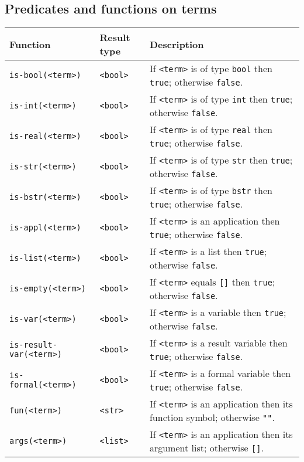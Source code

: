 \subsection{Predicates and functions on terms}
\begin{tabular}{|l|l|p{8cm}|} \hline
 Function				& Result type 	& Description \\ \hline
 {\tt is-bool(<term>)}			& {\tt  <bool>} & If {\tt <term>} is of type {\tt bool} then {\tt true};
							  otherwise {\tt false}.\\
 {\tt is-int(<term>)}			& {\tt  <bool>} & If {\tt <term>} is of type {\tt int} then {\tt true};
							  otherwise {\tt false}.\\
 {\tt is-real(<term>)}			& {\tt  <bool>} & If {\tt <term>} is of type {\tt real} then {\tt true};
							  otherwise {\tt false}.\\
 {\tt is-str(<term>)}			& {\tt  <bool>} & If {\tt <term>} is of type {\tt str} then {\tt true};
							  otherwise {\tt false}.\\
 {\tt is-bstr(<term>)}			& {\tt  <bool>} & If {\tt <term>} is of type {\tt bstr} then {\tt true};
							  otherwise {\tt false}.\\
 {\tt is-appl(<term>)}			& {\tt  <bool>} & If {\tt <term>} is an application then {\tt true};
							  otherwise {\tt false}.\\
 {\tt is-list(<term>)}			& {\tt  <bool>} & If {\tt <term>} is a list then {\tt true};
							  otherwise {\tt false}.\\
 {\tt is-empty(<term>)}			& {\tt  <bool>} & If {\tt <term>} equals {\tt []} then {\tt true};
							  otherwise {\tt false}.\\
 {\tt is-var(<term>)}			& {\tt  <bool>} & If {\tt <term>} is a variable then {\tt true};
							  otherwise {\tt false}.\\
 {\tt is-result-var(<term>)}		& {\tt  <bool>} & If {\tt <term>} is a result variable then {\tt true};
							  otherwise {\tt false}.\\
 {\tt is-formal(<term>)}		& {\tt  <bool>} & If {\tt <term>} is a formal variable then {\tt true};
							  otherwise {\tt false}.\\
 {\tt fun(<term>)}			& {\tt  <str>} & If {\tt <term>} is an application then its function symbol;
							  otherwise {\tt ""}.\\
 {\tt args(<term>)}			& {\tt  <list>} & If {\tt <term>} is an application then its argument list;
							  otherwise {\tt []}.\\ \hline
\end{tabular}


